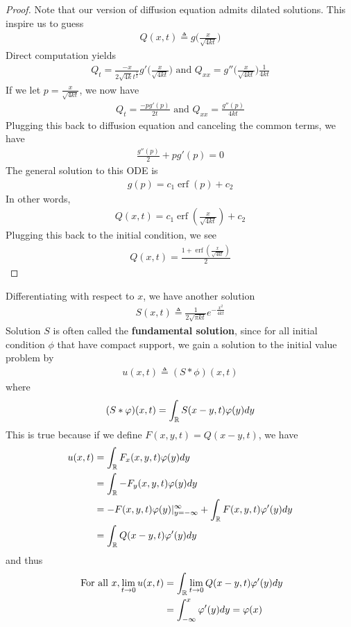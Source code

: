 \documentclass{report}
\begin{document}
\begin{proof}
Note that our version of diffusion equation admits dilated solutions. This inspire us to guess 
\begin{align*}
Q(x,t)\triangleq g \Big( \frac{x}{\sqrt{4kt} } \Big)
\end{align*}
Direct computation yields
\begin{align*}
Q_t= \frac{-x}{2\sqrt{4k}t^{\frac{3}{2}}}g'\Big( \frac{x}{\sqrt{4kt} } \Big)\text{ and }Q_{xx}=g''\Big(\frac{x}{\sqrt{4kt} } \Big) \frac{1}{4kt}
\end{align*}
If we let $p= \frac{x}{\sqrt{4kt} }$, we now have 
\begin{align*}
Q_t=\frac{-pg'(p)}{2t}\text{ and }Q_{xx}=\frac{g''(p)}{4kt} 
\end{align*}
Plugging this back to diffusion equation and canceling the common terms, we have
\begin{align*}
\frac{g''(p)}{2}+ pg'(p)=0
\end{align*}
The general solution to this ODE is 
\begin{align*}
g(p)=c_1\operatorname{erf}(p)+c_2
\end{align*}
In other words,
\begin{align*}
Q(x,t)=c_1 \operatorname{erf}(\frac{x}{\sqrt{4kt}})+ c_2
\end{align*}
Plugging this back to the initial condition, we see 
\begin{align*}
Q(x,t)= \frac{1+ \operatorname{erf}(\frac{x}{\sqrt{4kt} })}{2}
\end{align*}
\end{proof}
\begin{mdframed}
Differentiating  with respect to $x$, we have another solution
\begin{align*}
S(x,t)\triangleq  \frac{1}{2 \sqrt{\pi kt} }e^{- \frac{x^2}{4kt}}
\end{align*}
Solution $S$ is often called the \textbf{fundamental solution}, since for all initial condition $\phi$ that have compact support, we gain a solution to the initial value problem by 
\begin{align*}
u(x,t)\triangleq (S*\phi)(x,t)
\end{align*}
where 
\begin{align*}
  (S*\varphi )(x,t)=\int_{\mathbb{R}} S(x-y,t)\varphi (y)dy
\end{align*}
This is true because if we define $F(x,y,t)=Q(x-y,t)$, we have
\begin{align*}
u(x,t)&=\int_{\mathbb{R}} F_x(x,y,t)\varphi (y)dy\\
&=\int_{\mathbb{R}} -F_y(x,y,t)\varphi (y)dy\\
&= -F(x,y,t)\varphi (y)|_{y=-\infty}^{\infty}+\int_{\mathbb{R}} F(x,y,t)\varphi '(y)dy \\
&=\int_{\mathbb{R}} Q(x-y,t)\varphi '(y)dy
\end{align*}
and thus 
\begin{align*}
\text{ For all }x,\lim_{t\to 0}u(x,t)&=\int_{\mathbb{R}} \lim_{t\to 0}Q(x-y,t)\varphi '(y)dy \\
&= \int_{-\infty}^x \varphi '(y) dy =\varphi (x)
\end{align*}
\end{mdframed}
\end{document}
